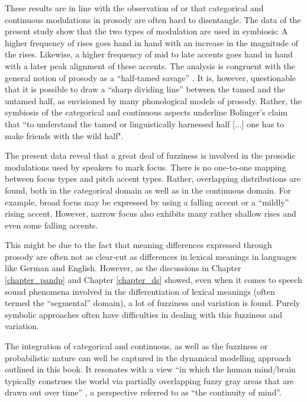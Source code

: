 These results are in line with the observation of \citet{Bolinger1961} or \citet{Ladd2014} that categorical and continuous modulations in prosody are often hard to disentangle. The data of the present study show that the two types of modulation are used in symbiosis: A higher frequency of rises goes hand in hand with an increase in the magnitude of the rises. Likewise, a higher frequency of mid to late accents goes hand in hand with a later peak alignment of these accents. The analysis is congruent with the general notion of prosody as a ``half-tamed savage” \citep{Bolinger1978, Gussenhoven2004}. It is, however, questionable that it is possible to draw a ``sharp dividing line” \citep[49]{Gussenhoven2004} between the tamed and the untamed half, as envisioned by many phonological models of prosody. Rather, the symbiosis of the categorical and continuous aspects underline Bolinger's \citeyearpar[475]{Bolinger1978} claim that ``to understand the tamed or linguistically harnessed half [...] one has to make friends with the wild half".

The present data reveal that a great deal of fuzziness is involved in the prosodic modulations used by speakers to mark focus. There is no one-to-one mapping between focus types and pitch accent types. Rather, overlapping distributions are found, both in the categorical domain as well as in the continuous domain. For example, broad focus may be expressed by using a falling accent or a ``mildly” rising accent. However, narrow focus also exhibits many rather shallow rises and even some falling accents. 

This might be due to the fact that meaning differences expressed through prosody are often not as clear-cut as differences in lexical meanings in languages like German and English. However, as the discussions in Chapter \ref{chapter_pandp} and Chapter \ref{chapter_ds} showed, even when it comes to speech sound phenomena involved in the differentiation of lexical meanings (often termed the ``segmental” domain), a lot of fuzziness and variation is found. Purely symbolic approaches often have difficulties in dealing with this fuzziness and variation. 

The integration of categorical and continuous, as well as the fuzziness or probabilistic nature can well be captured in the dynamical modelling approach outlined in this book. It resonates with a view ``in which the human mind/brain typically construes the world via partially overlapping fuzzy gray areas that are drawn out over time” \citep[3]{Spivey2007}, a perspective referred to as ``the continuity of mind”. 

